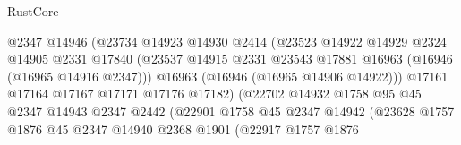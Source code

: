 \begin{lexlean}{RustCore}
\begin{coremodule}
                                      @2347
                                      @14946
                                      (@23734
                                        @14923
                                        @14930
                                        @2414
                                        (@23523
                                          @14922
                                          @14929
                                          @2324
                                          @14905
                                          @2331
                                          @17840
                                          (@23537
                                            @14915
                                            @2331
                                            @23543
                                            @17881
                                            @16963
                                            (@16946 (@16965 @14916 @2347)))
                                          @16963
                                          (@16946 (@16965 @14906 @14922)))
                                        @17161
                                        @17164
                                        @17167
                                        @17171
                                        @17176
                                        @17182)
                                      (@22702
                                        @14932
                                        @1758
                                        @95
                                        @45
                                        @2347
                                        @14943
                                        @2347
                                        @2442
                                        (@22901
                                          @1758
                                          @45
                                          @2347
                                          @14942
                                          (@23628
                                            @1757
                                            @1876
                                            @45
                                            @2347
                                            @14940
                                            @2368
                                            @1901
                                            (@22917
                                              @1757
                                              @1876

\end{coremodule}
\end{lexlean}
